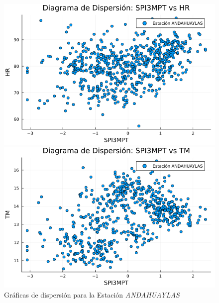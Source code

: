 \begin{figure}[H]
\centering
\caption{Gráficas de dispersión para la Estación \textit{ANDAHUAYLAS}}
\begin{minipage}{0.33\textwidth}
    \centering
    \includegraphics[width=\linewidth]{Capitulos/Scaterplot/ANDAHUAYLAS_SPI3MPT_vs_HR.png}
\end{minipage}\hfill
\begin{minipage}{0.33\textwidth}
    \centering
    \includegraphics[width=\linewidth]{Capitulos/Scaterplot/ANDAHUAYLAS_SPI3MPT_vs_TM.png}
\end{minipage}\hfill
\begin{minipage}{0.33\textwidth}
    \centering

\end{minipage}
\end{figure}
